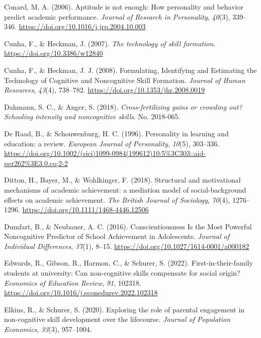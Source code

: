 \documentclass{article}
\newlength{\cslhangindent}
\newlength{\cslentryspacingunit} %
\newenvironment{CSLReferences}[2] %
 {%
  \setlength{\parindent}{0pt}
  \ifodd #1
  \let\oldpar\par
  \def\par{\hangindent=\cslhangindent\oldpar}
  \fi
  \setlength{\parskip}{#2\cslentryspacingunit}
 }%
 {}
\begin{document}
\begin{CSLReferences}{1}{0}
\leavevmode{}%
Conard, M. A. (2006). Aptitude is not enough: How personality and
behavior predict academic performance. \emph{Journal of Research in
Personality}, \emph{40}(3), 339--346.
\url{https://doi.org/10.1016/j.jrp.2004.10.003}

\leavevmode{}%
Cunha, F., \& Heckman, J. (2007). \emph{The technology of skill
formation}. \url{https://doi.org/10.3386/w12840}

\leavevmode{}%
Cunha, F., \& Heckman, J. J. (2008). Formulating, Identifying and
Estimating the Technology of Cognitive and Noncognitive Skill Formation.
\emph{Journal of Human Resources}, \emph{43}(4), 738--782.
\url{https://doi.org/10.1353/jhr.2008.0019}

\leavevmode{}%
Dahmann, S. C., \& Anger, S. (2018). \emph{Cross-fertilizing gains or
crowding out? Schooling intensity and noncognitive skills}. No.
2018-065.

\leavevmode{}%
De Raad, B., \& Schouwenburg, H. C. (1996). Personality in learning and
education: a review. \emph{European Journal of Personality},
\emph{10}(5), 303--336.
\url{https://doi.org/10.1002/(sici)1099-0984(199612)10:5\%3C303::aid-per262\%3E3.0.co;2-2}

\leavevmode{}%
Ditton, H., Bayer, M., \& Wohlkinger, F. (2018). Structural and
motivational mechanisms of academic achievement: a mediation model of
social{-}background effects on academic achievement. \emph{The British
Journal of Sociology}, \emph{70}(4), 1276--1296.
\url{https://doi.org/10.1111/1468-4446.12506}

\leavevmode{}%
Dumfart, B., \& Neubauer, A. C. (2016). Conscientiousness Is the Most
Powerful Noncognitive Predictor of School Achievement in Adolescents.
\emph{Journal of Individual Differences}, \emph{37}(1), 8--15.
\url{https://doi.org/10.1027/1614-0001/a000182}

\leavevmode{}%
Edwards, R., Gibson, R., Harmon, C., \& Schurer, S. (2022).
First-in-their-family students at university: Can non-cognitive skills
compensate for social origin? \emph{Economics of Education Review},
\emph{91}, 102318.
\url{https://doi.org/10.1016/j.econedurev.2022.102318}

\leavevmode{}%
Elkins, R., \& Schurer, S. (2020). Exploring the role of parental
engagement in non-cognitive skill development over the lifecourse.
\emph{Journal of Population Economics}, \emph{33}(3), 957--1004.


\end{CSLReferences}
\end{document}
